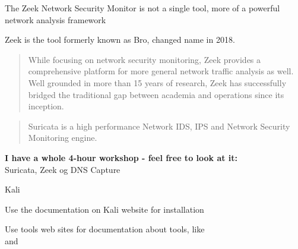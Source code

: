 \documentclass[Screen16to9,17pt]{foils}
\begin{document}


The Zeek Network Security Monitor is not a single tool, more of a
powerful network analysis framework

Zeek is the tool formerly known as Bro, changed name in 2018. 




\begin{quote}
While focusing on network security monitoring, Zeek provides a comprehensive platform for more general network traffic analysis as well. Well grounded in more than 15 years of research, Zeek has successfully bridged the traditional gap between academia and operations since its inception.
\end{quote}




\begin{quote}
Suricata is a high performance Network IDS, IPS and Network Security Monitoring engine.
\end{quote}


{\bf I have a whole 4-hour workshop - feel free to look at it:}\\
Suricata, Zeek og DNS Capture\\
{\small{}}




\begin{list1}
\item Kali 
\item Use the documentation on Kali website for installation
\item Use tools web sites for documentation about tools, like\\  and 
\end{list1}


\end{document}
